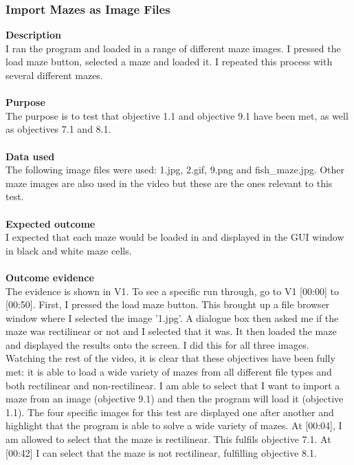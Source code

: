 \documentclass[titlepage]{article}
\begin{document}
\subsubsection{Import Mazes as Image Files}
\textbf{Description}\\
I ran the program and loaded in a range of different maze images. I pressed the load maze button, selected a maze and loaded it. I repeated this process with several different mazes.\\\\
\textbf{Purpose}\\
The purpose is to test that objective 1.1 and objective 9.1 have been met, as well as objectives 7.1 and 8.1.\\\\
\textbf{Data used} 
\\The following image files were used: 1.jpg, 2.gif, 9.png and fish\_maze.jpg. Other maze images are also used in the video but these are the ones relevant to this test.\\\\
\textbf{Expected outcome}\\
I expected that each maze would be loaded in and displayed in the GUI window in black and white maze cells.\\\\
\textbf{Outcome evidence}\\
The evidence is shown in V1. To see a specific run through, go to V1 [00:00] to [00:50]. First, I pressed the load maze button. This brought up a file browser window where I selected the image '1.jpg'. A dialogue box then asked me if the maze was rectilinear or not and I selected that it was. It then loaded the maze and displayed the results onto the screen. I did this for all three images. Watching the rest of the video, it is clear that these objectives have been fully met: it is able to load a wide variety of mazes from all different file types and both rectilinear and non-rectilinear. I am able to select that I want to import a maze from an image (objective 9.1) and then the program will load it (objective 1.1). The four specific images for this test are displayed one after another and highlight that the program is able to solve a wide variety of mazes. At [00:04], I am allowed to select that the maze is rectilinear. This fulfils objective 7.1. At [00:42] I can select that the maze is not rectilinear, fulfilling objective 8.1.
\end{document}
